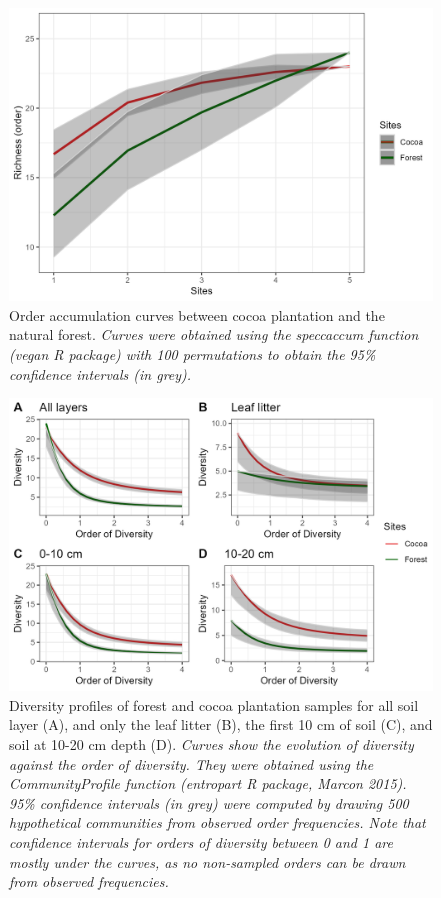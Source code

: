 \documentclass[fleqn,10pt]{ArtEcoFoG} %
\begin{document}
\normalsize

\scriptsize

\begin{figure}

{\centering \includegraphics[width=0.8\linewidth,]{rapport_files/figure-latex/accumcurve-1} 

}

\caption{Order accumulation curves between cocoa plantation and the natural forest. \textit{Curves were obtained using the speccaccum function (vegan R package) with 100 permutations to obtain the 95\% confidence intervals (in grey).}}\label{fig:accumcurve}
\end{figure}

\normalsize

\scriptsize

\begin{figure}

{\centering \includegraphics[width=0.8\linewidth,]{rapport_files/figure-latex/diversity-1} 

}

\caption{Diversity profiles of forest and cocoa plantation samples for all soil layer (A), and only the leaf litter (B), the first 10 cm of soil (C), and soil at 10-20 cm depth (D). \textit{Curves show the evolution of diversity against the order of diversity. They were obtained using the CommunityProfile function (entropart R package, Marcon 2015). 95\% confidence intervals (in grey) were computed by drawing 500 hypothetical communities from observed order frequencies. Note that confidence intervals for orders of diversity between 0 and 1 are mostly under the curves, as no non-sampled orders can be drawn from observed frequencies.}}\label{fig:diversity}
\end{figure}
\end{document}
